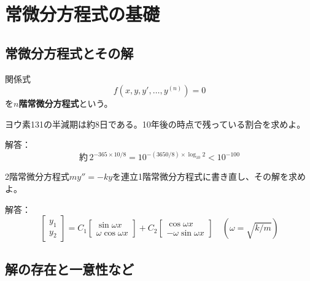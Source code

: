 \documentclass[report]{jlreq}
\begin{document}
\chapter{常微分方程式の基礎}

\section{常微分方程式とその解}

\begin{definition}[1.1.1 $n$階常微分方程式]
    関係式
    \begin{equation}
        f(x, y, y', \dots, y^{(n)}) = 0
    \end{equation}
    を\textbf{$n$階常微分方程式}という。
\end{definition}

\begin{problem}[例1.1.3]
    ヨウ素131の半減期は約8日である。10年後の時点で残っている割合を求めよ。

    解答：
    \begin{equation}
        \text{約}\, 2^{-365 \times 10 / 8} = 10^{-(3650 / 8) \times \log_{10} 2} < 10^{-100}
    \end{equation}
\end{problem}

\begin{problem}[例1.1.7]
    2階常微分方程式$my'' = -ky$を連立1階常微分方程式に書き直し、その解を求めよ。

    解答：
    \begin{equation}
        \begin{bmatrix}
            y_1 \\ y_2
        \end{bmatrix}
        =
        C_1 \begin{bmatrix}
            \sin \omega x \\
            \omega \cos \omega x
        \end{bmatrix}
        + C_2 \begin{bmatrix}
            \cos \omega x \\
            - \omega \sin \omega x
        \end{bmatrix}
        \quad \left(\omega = \sqrt{k / m}\right)
    \end{equation}
\end{problem}

\section{解の存在と一意性など}
\end{document}
